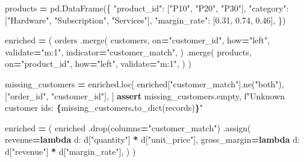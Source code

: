 \documentclass[
  12pt,
]{article}
\newenvironment{Shaded}{\begin{snugshade}}{\end{snugshade}}
\newcommand{\ControlFlowTok}[1]{\textcolor[rgb]{0.13,0.29,0.53}{\textbf{#1}}}
\newcommand{\FloatTok}[1]{\textcolor[rgb]{0.00,0.00,0.81}{#1}}
\newcommand{\KeywordTok}[1]{\textcolor[rgb]{0.13,0.29,0.53}{\textbf{#1}}}
\newcommand{\NormalTok}[1]{#1}
\newcommand{\OperatorTok}[1]{\textcolor[rgb]{0.81,0.36,0.00}{\textbf{#1}}}
\newcommand{\SpecialCharTok}[1]{\textcolor[rgb]{0.81,0.36,0.00}{\textbf{#1}}}
\newcommand{\SpecialStringTok}[1]{\textcolor[rgb]{0.31,0.60,0.02}{#1}}
\newcommand{\StringTok}[1]{\textcolor[rgb]{0.31,0.60,0.02}{#1}}
\begin{document}
\begin{Shaded}
\begin{Highlighting}[]
\NormalTok{products }\OperatorTok{=}\NormalTok{ pd.DataFrame(\{}
    \StringTok{"product\_id"}\NormalTok{: [}\StringTok{"P10"}\NormalTok{, }\StringTok{"P20"}\NormalTok{, }\StringTok{"P30"}\NormalTok{],}
    \StringTok{"category"}\NormalTok{: [}\StringTok{"Hardware"}\NormalTok{, }\StringTok{"Subscription"}\NormalTok{, }\StringTok{"Services"}\NormalTok{],}
    \StringTok{"margin\_rate"}\NormalTok{: [}\FloatTok{0.31}\NormalTok{, }\FloatTok{0.74}\NormalTok{, }\FloatTok{0.46}\NormalTok{],}
\NormalTok{\})}

\NormalTok{enriched }\OperatorTok{=}\NormalTok{ (}
\NormalTok{    orders}
\NormalTok{    .merge(}
\NormalTok{        customers,}
\NormalTok{        on}\OperatorTok{=}\StringTok{"customer\_id"}\NormalTok{,}
\NormalTok{        how}\OperatorTok{=}\StringTok{"left"}\NormalTok{,}
\NormalTok{        validate}\OperatorTok{=}\StringTok{"m:1"}\NormalTok{,}
\NormalTok{        indicator}\OperatorTok{=}\StringTok{"customer\_match"}\NormalTok{,}
\NormalTok{    )}
\NormalTok{    .merge(}
\NormalTok{        products,}
\NormalTok{        on}\OperatorTok{=}\StringTok{"product\_id"}\NormalTok{,}
\NormalTok{        how}\OperatorTok{=}\StringTok{"left"}\NormalTok{,}
\NormalTok{        validate}\OperatorTok{=}\StringTok{"m:1"}\NormalTok{,}
\NormalTok{    )}
\NormalTok{)}

\NormalTok{missing\_customers }\OperatorTok{=}\NormalTok{ enriched.loc[}
\NormalTok{    enriched[}\StringTok{"customer\_match"}\NormalTok{].ne(}\StringTok{"both"}\NormalTok{),}
\NormalTok{    [}\StringTok{"order\_id"}\NormalTok{, }\StringTok{"customer\_id"}\NormalTok{],}
\NormalTok{]}
\ControlFlowTok{assert}\NormalTok{ missing\_customers.empty, }\SpecialStringTok{f"Unknown customer ids: }\SpecialCharTok{\{}\NormalTok{missing\_customers}\SpecialCharTok{.}\NormalTok{to\_dict(}\StringTok{\textquotesingle{}records\textquotesingle{}}\NormalTok{)}\SpecialCharTok{\}}\SpecialStringTok{"}

\NormalTok{enriched }\OperatorTok{=}\NormalTok{ (}
\NormalTok{    enriched}
\NormalTok{    .drop(columns}\OperatorTok{=}\StringTok{"customer\_match"}\NormalTok{)}
\NormalTok{    .assign(}
\NormalTok{        revenue}\OperatorTok{=}\KeywordTok{lambda}\NormalTok{ d: d[}\StringTok{"quantity"}\NormalTok{] }\OperatorTok{*}\NormalTok{ d[}\StringTok{"unit\_price"}\NormalTok{],}
\NormalTok{        gross\_margin}\OperatorTok{=}\KeywordTok{lambda}\NormalTok{ d: d[}\StringTok{"revenue"}\NormalTok{] }\OperatorTok{*}\NormalTok{ d[}\StringTok{"margin\_rate"}\NormalTok{],}
\NormalTok{    )}
\NormalTok{)}
\end{Highlighting}
\end{Shaded}
\end{document}
